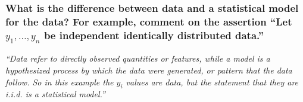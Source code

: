 \documentclass[12pt]{beamer}
\newcommand\ans[1]{{\it ``#1''}}
\begin{document}
\begin{frame} %
  \frametitle{ What is the difference between data and a statistical model for the data? For example, comment on the assertion ``Let $y_1,\dots,y_n$ be independent identically distributed data.''}


  \ans{Data refer to directly observed quantities or features, while a model is a hypothesized process by which the data were generated, or pattern that the data follow.  So in this example the $y_i$ values are data, but the statement that they are i.i.d.  is a statistical model.}
  






\end{frame}
\end{document}
